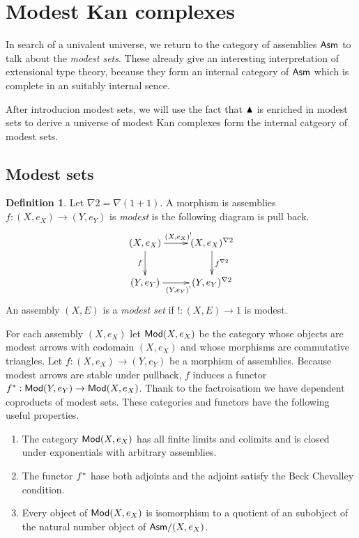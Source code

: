 \documentclass{amsart}
\theoremstyle{plain}
\theoremstyle{definition}
\newtheorem{defin}[theorem]{Definition}
\newcommand\hide[1]{}
\begin{document}
\section{Modest Kan complexes}
In search of a univalent universe, we return to the category of assemblies $\mathsf{Asm}$ to talk about the \emph{modest sets}. These already give an interesting interpretation of extensional type theory, because they form an internal category of $\mathsf{Asm}$ which is complete in an suitably internal sence. 

After introducion modest sets, we will use the fact that $\blacktriangle$ is enriched in modest sets to derive a universe of modest Kan complexes form the internal catgeory of modest sets.

\subsection{Modest sets}
\newcommand\bang{!}
\newcommand\boldy{\nabla 2}
\begin{defin} Let $\boldy = \nabla(1+1)$. A morphism is assemblies $f:(X,e_X)\to(Y,e_Y)$ is \emph{modest} is the following diagram is pull back.
\[\xymatrix{
(X,e_X) \ar[r]^{(X,e_X)^\bang} \ar[d]_{f} & (X,e_X)^{\boldy} \ar[d]^{f^{\boldy}}\\
(Y,e_Y) \ar[r]_{(Y,e_Y)^\bang} & (Y,e_Y)^{\boldy}
}\]
An assembly $(X,E)$ is a \emph{modest set} if $!:(X,E)\to 1$ is modest.
\end{defin}

For each assembly $(X,e_X)$ let $\mathsf{Mod}(X,e_X)$ be the category whose objects are modest arrows with codomain $(X,e_X)$ and whose morphisms are commutative triangles. Let $f:(X,e_X)\to(Y,e_Y)$ be a morphism of assemblies. Because modest arrows are stable under pullback, $f$ induces a functor $f^*:\mathsf{Mod}(Y,e_Y) \to \mathsf{Mod}(X,e_X)$. Thank to the factroisatiom we have dependent coproducts of modest sets. These categories and functors have the following useful properties.\hide{cite Hyland et alt. Rosolini's modest sets maybe...}
\begin{enumerate}
\item The category $\mathsf{Mod}(X,e_X)$ has all finite limits and colimits and is closed under exponentials with arbitrary assemblies.
\item The functor $f^*$ hase both adjoints and the adjoint satisfy the Beck Chevalley condition.
\item Every object of $\mathsf{Mod}(X,e_X)$ is isomorphism to a quotient of an subobject of the natural number object of $\mathsf{Asm}/(X,e_X)$.
\end{enumerate}
\end{document}

